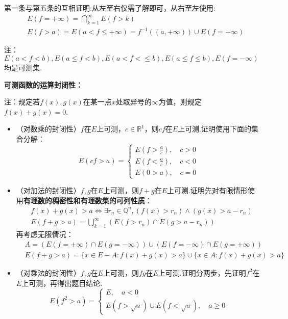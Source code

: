 \documentclass[bwprint, withoutpreface]{cumcmthesis}
\begin{document}
第一条与第五条的互相证明:从左至右仅需了解即可，从右至左使用:
\begin{align*}
	& E(f = +\infty) = \bigcap_{k = 1}^{\infty}{E(f > k)} \\
	& E(f > a) = E(a < f \leqslant +\infty) = f^{-1}((a, +\infty)) \cup E(f = +\infty)
\end{align*}

注：$E(a < f < b), E(a \leqslant f < b), E(a < f < \leqslant b), E(a \leqslant f \leqslant b), E(f = -\infty)$均是可测集.

\textbf{可测函数的运算封闭性：}

注：规定若$f(x), g(x)$在某一点$x$处取异号的$\infty$为值，则规定$f(x) + g(x) = 0$.

\begin{itemize}[itemindent=2em]
	\item （对数乘的封闭性）$f$在$E$上可测，$c \in \mathbb{R}^1$，则$cf$在$E$上可测.证明使用下面的集合分解：
	\begin{equation*}
	E(cf > a) = 
	\begin{cases}
		E(f > \frac{a}{c}), \quad c > 0 \\
		E(f < \frac{a}{c}), \quad c < 0 \\
		E(0 > a), \quad c = 0
	\end{cases}
	\end{equation*}
	\item （对加法的封闭性）$f, g$在$E$上可测，则$f+g$在$E$上可测.证明先对有限情形使用\textbf{有理数的稠密性和有理数集的可列性质}：
	\begin{align*}
		& f(x) + g(x) > a \Leftrightarrow \exists r_n \in \mathbb{Q}^n, (f(x) > r_n) \wedge (g(x) > a - r_n) \\
		& E(f + g > a) = \bigcup_{k = 1}^{\infty}{(E(f > r_n) \cap E(g > a - r_n))}
	\end{align*}
	\indent 再考虑无限情况：
	\begin{align*}
		& A = (E(f = +\infty) \cap E(g = -\infty)) \cup (E(f = -\infty) \cap E(g = +\infty)) \\
		& E(f + g > a) = \{x \in E - A: f(x) + g(x) > a\} \cup \{x \in A: f(x) + g(x) > a\}
	\end{align*}
	\item （对乘法的封闭性）$f, g$在$E$上可测，则$fg$在$E$上可测.证明分两步，先证明$f^2$在$E$上可测，再得出题目结论.
	\begin{equation*}
	E(f^2 > a) = 
	\begin{cases}
		E, \quad a < 0 \\ 
		E(f > \sqrt{a}) \cup E(f < \sqrt{a}), \quad a \geqslant 0

\end{cases}
\end{equation*}
\end{itemize}
\end{document}
